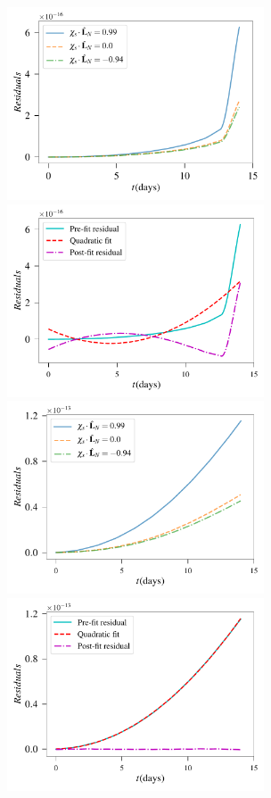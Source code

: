 \documentclass[twocolumn,showpacs,aps,prd,nobibnotes,floatfix]{revtex4-1}
\begin{document}
\begin{widetext}

\begin{figure}
	\includegraphics[width=3.0in]{../plots/PlotfromMathematicaData/ResidualGrowth2weeksDiffSpinsInDays10pow8MSun.pdf}
	\includegraphics[width=3.0in]{../plots/PlotfromMathematicaData/ResidualGrowth2weeksDiffSpinsInDays10pow8MSunQuadSub.pdf}
	\includegraphics[width=3.0in]{../plots/PlotfromMathematicaData/ResidualGrowth2weeksDiffSpinsInDays10pow10MSun.pdf}
	\includegraphics[width=3.0in]{../plots/PlotfromMathematicaData/ResidualGrowth2weeksDiffSpinsInDays10pow10MSunQuadSub.pdf}

\end{figure}
\end{widetext}
\end{document}
